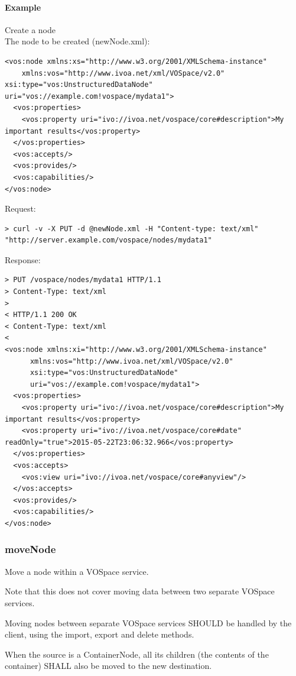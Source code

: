 \documentclass[11pt,a4paper]{ivoa}
\begin{document}
\paragraph{Example}
Create a node
\\[5px]
\noindent
The node to be created (newNode.xml):
\begin{lstlisting}
<vos:node xmlns:xs="http://www.w3.org/2001/XMLSchema-instance"
    xmlns:vos="http://www.ivoa.net/xml/VOSpace/v2.0" xsi:type="vos:UnstructuredDataNode" uri="vos://example.com!vospace/mydata1">
  <vos:properties>
    <vos:property uri="ivo://ivoa.net/vospace/core#description">My important results</vos:property>
  </vos:properties>
  <vos:accepts/>
  <vos:provides/>
  <vos:capabilities/>
</vos:node>
\end{lstlisting}
Request:
\begin{lstlisting}
> curl -v -X PUT -d @newNode.xml -H "Content-type: text/xml" "http://server.example.com/vospace/nodes/mydata1"
\end{lstlisting}
Response:
\begin{lstlisting}
> PUT /vospace/nodes/mydata1 HTTP/1.1
> Content-Type: text/xml
>
< HTTP/1.1 200 OK
< Content-Type: text/xml
<
<vos:node xmlns:xi="http://www.w3.org/2001/XMLSchema-instance"
      xmlns:vos="http://www.ivoa.net/xml/VOSpace/v2.0"
      xsi:type="vos:UnstructuredDataNode" 
      uri="vos://example.com!vospace/mydata1">
  <vos:properties>
    <vos:property uri="ivo://ivoa.net/vospace/core#description">My important results</vos:property>
    <vos:property uri="ivo://ivoa.net/vospace/core#date" readOnly="true">2015-05-22T23:06:32.966</vos:property>
  </vos:properties>
  <vos:accepts>
    <vos:view uri="ivo://ivoa.net/vospace/core#anyview"/>
  </vos:accepts>
  <vos:provides/>
  <vos:capabilities/>
</vos:node>
\end{lstlisting}

\subsubsection{moveNode}
\label{subsubsec:movenode}
Move a node within a VOSpace service.

Note that this does not cover moving data between two separate VOSpace services.

Moving nodes between separate VOSpace services SHOULD be handled by the client, using the import, export and delete methods.

When the source is a ContainerNode, all its children (the contents of the container) SHALL also be moved to the new destination.
\end{document}
